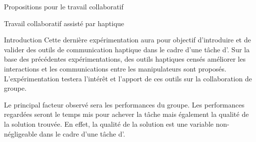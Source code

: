 \documentclass[myfrancais]{mythesis}
\begin{document}
	\begin{mypart}{Propositions pour le travail collaboratif}
		\begin{mychapter}{Travail collaboratif assisté par haptique}
			\begin{mysection}{Introduction}
				Cette dernière expérimentation aura pour objectif d'introduire et de valider des outils de communication haptique dans le cadre d'une tâche d'.
				Sur la base des précédentes expérimentations, des outils haptiques censés améliorer les interactions et les communications entre les manipulateurs sont proposés.
				L'expérimentation testera l'intérêt et l'apport de ces outils sur la collaboration de groupe.

				Le principal facteur observé sera les performances du groupe.
				Les performances regardées seront le temps mis pour achever la tâche mais également la qualité de la solution trouvée.
				En effet, la qualité de la solution est une variable non-négligeable dans le cadre d'une tâche d'.


\end{mysection}
\end{mychapter}
\end{mypart}
\end{document}
